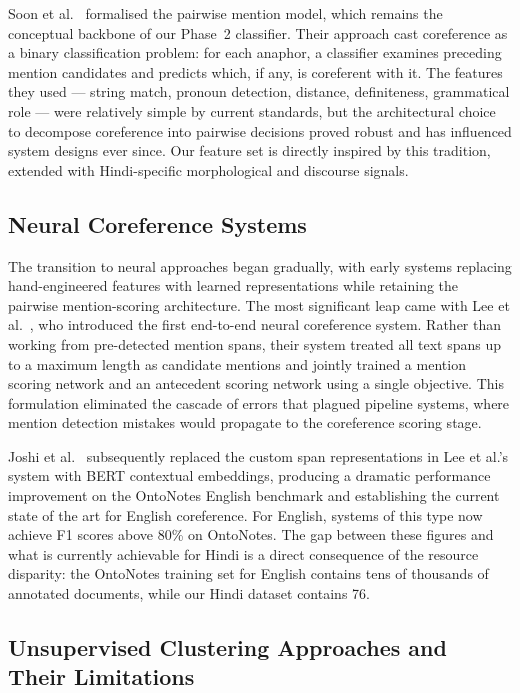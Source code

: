 \documentclass[12pt,a4paper]{report}
\begin{document}
Soon et al.\ \cite{soon2001machine} formalised the pairwise mention model, which remains the conceptual backbone of our Phase~2 classifier. Their approach cast coreference as a binary classification problem: for each anaphor, a classifier examines preceding mention candidates and predicts which, if any, is coreferent with it. The features they used --- string match, pronoun detection, distance, definiteness, grammatical role --- were relatively simple by current standards, but the architectural choice to decompose coreference into pairwise decisions proved robust and has influenced system designs ever since. Our feature set is directly inspired by this tradition, extended with Hindi-specific morphological and discourse signals.

\subsection{Neural Coreference Systems}

The transition to neural approaches began gradually, with early systems replacing hand-engineered features with learned representations while retaining the pairwise mention-scoring architecture. The most significant leap came with Lee et al.\ \cite{lee2017end}, who introduced the first end-to-end neural coreference system. Rather than working from pre-detected mention spans, their system treated all text spans up to a maximum length as candidate mentions and jointly trained a mention scoring network and an antecedent scoring network using a single objective. This formulation eliminated the cascade of errors that plagued pipeline systems, where mention detection mistakes would propagate to the coreference scoring stage.

Joshi et al.\ \cite{joshi2019bert} subsequently replaced the custom span representations in Lee et al.'s system with BERT contextual embeddings, producing a dramatic performance improvement on the OntoNotes English benchmark and establishing the current state of the art for English coreference. For English, systems of this type now achieve F1 scores above 80\% on OntoNotes. The gap between these figures and what is currently achievable for Hindi is a direct consequence of the resource disparity: the OntoNotes training set for English contains tens of thousands of annotated documents, while our Hindi dataset contains 76.

\subsection{Unsupervised Clustering Approaches and Their Limitations}
\end{document}
